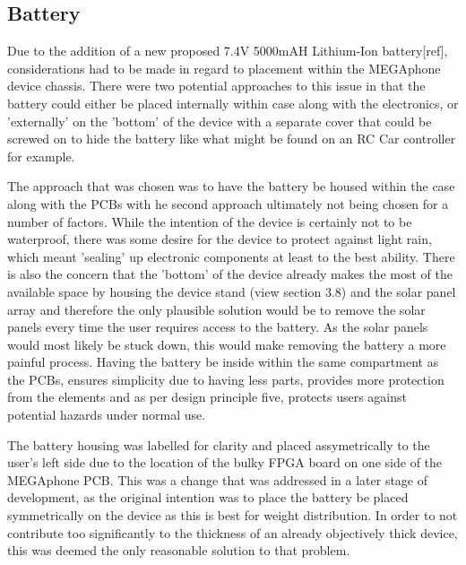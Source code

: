 \subsection{Battery}

Due to the addition of a new proposed 7.4V 5000mAH Lithium-Ion battery[ref], considerations had to be made in regard to placement within the MEGAphone device chassis.
There were two potential approaches to this issue in that the battery could either be placed internally within case along with the electronics, or 'externally' on the 'bottom' of the device with a separate cover that could be screwed on to hide the battery like what might be found on an RC Car controller for example.

The approach that was chosen was to have the battery be housed within the case along with the PCBs with he second approach ultimately not being chosen for a number of factors.
While the intention of the device is certainly not to be waterproof, there was some desire for the device to protect against light rain, which meant 'sealing' up electronic components at least to the best ability.
There is also the concern that the 'bottom' of the device already makes the most of the available space by housing the device stand (view section 3.8) and the solar panel array and therefore the only plausible solution would be to remove the solar panels every time the user requires access to the battery.
As the solar panels would most likely be stuck down, this would make removing the battery a more painful process.
Having the battery be inside within the same compartment as the PCBs, ensures simplicity due to having less parts, provides more protection from the elements and as per design principle five, protects users against potential hazards under normal use.

The battery housing was labelled for clarity and placed assymetrically to the user's left side due to the location of the bulky FPGA board on one side of the MEGAphone PCB.
This was a change that was addressed in a later stage of development, as the original intention was to place the battery be placed symmetrically on the device as this is best for weight distribution.
In order to not contribute too significantly to the thickness of an already objectively thick device, this was deemed the only reasonable solution to that problem.


